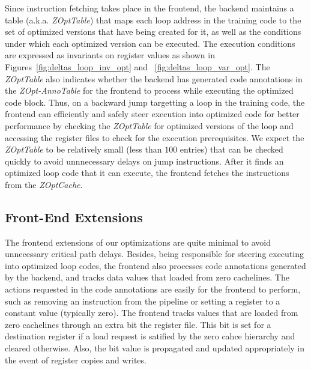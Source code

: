   Since instruction fetching takes place in the frontend, the backend maintains a table (a.k.a. {\it ZOptTable}) that maps each loop address in the training code to the set of optimized versions that have being created for it, as well as the conditions under which each optimized version can be executed.   The execution conditions are expressed as invariants on register values as shown in Figures~\ref{fig:deltas_loop_inv_opt} and ~\ref{fig:deltas_loop_var_opt}.  The {\it ZOptTable} also indicates whether the backend has generated code annotations in the {\it ZOpt-AnnoTable} for the frontend to process while executing the optimized code block.  Thus, on a backward jump targetting a loop in the training code, the frontend can efficiently and safely steer execution into optimized code for better performance by checking  the {\it ZOptTable} for optimized versions of the loop and accessing the register files to check for the execution prerequisites.   We expect the {\it ZOptTable} to be relatively small (less than $100$ entries) that can be checked quickly to avoid unnnecessary delays on jump instructions.  After it finds an optimized loop code that it can execute, the frontend fetches the instructions from the {\it ZOptCache}. 
    
\subsection{Front-End Extensions}
The frontend extensions of our optimizations are quite minimal to avoid unnecessary critical path delays.  Besides, being responsible for steering executing into optimized loop codes, the frontend also processes code annotations generated by the backend, and tracks data values that loaded from zero cachelines.  The actions requested in the code annotations are easily for the frontend to perform, such as removing an instruction from the pipeline or setting a register to a constant value (typically zero).   The frontend tracks values that are loaded from zero cachelines through an extra bit the register file.  This bit is set for a destination register if a load request is satified by the zero cahce hierarchy and cleared otherwise.  Also, the bit value is propagated and updated appropriately in the event of register copies and writes. 